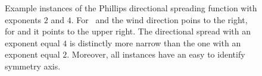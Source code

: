 \begin{figure}
{ }
\caption{Example instances of the Phillips directional spreading function with 
exponents $2$ and $4$. For~ and
 the wind direction poins to 
the right, for  and
 it points to the upper right. 
The directional spread with an exponent equal $4$ is distinctly more narrow 
than the one with an exponent equal $2$. Moreover, all instances have an easy 
to identify symmetry axis.}
\label{fig:phillips_directional_term}
\end{figure}
